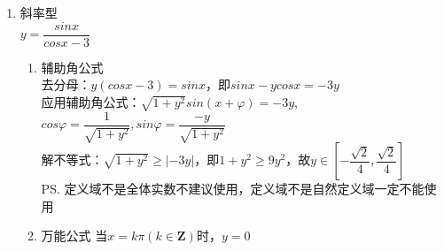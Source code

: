 \begin{enumerate}
\begin{enumerate}
        \item 斜率型 \\
        $y = \dfrac{sinx}{cosx - 3}$
        \begin{jieda}
            \begin{enumerate}
                \item 辅助角公式 \\
                去分母：$y (cosx - 3) = sinx$，即$sinx - y cosx = -3y$ \\
                应用辅助角公式：$\sqrt{1+y^2}sin(x+\varphi) = -3y$,$cos\varphi = \dfrac{1}{\sqrt{1+y^2}}, sin\varphi = \dfrac{-y}{\sqrt{1+y^2}}$ \\
                解不等式：$\sqrt{1+y^2} \geq |-3y|$，即$1+y^2 \geq 9y^2$，故$y \in \left[-\dfrac{\sqrt{2}}{4}, \dfrac{\sqrt{2}}{4}\right]$ \\
                \ps 定义域不是全体实数不建议使用，定义域不是自然定义域一定不能使用
                \item 万能公式
                当$x = k\pi (k \in \mathbf{Z})$时，$y = 0$
                

\end{enumerate}
\end{jieda}
\end{enumerate}
\end{enumerate}
